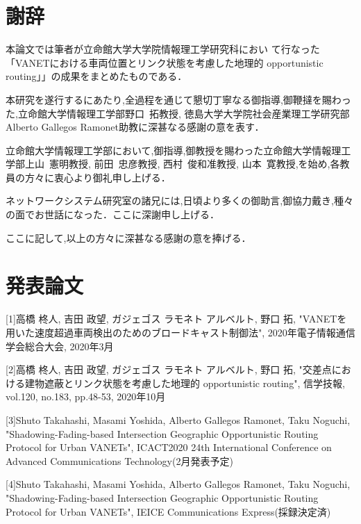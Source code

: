 \documentclass[10pt]{jreport}
\begin{document}
\chapter*{謝辞}
\sloppy 

本論文では筆者が立命館大学大学院情報理工学研究科におい
て行なった「VANETにおける車両位置とリンク状態を考慮した地理的
opportunistic routing」」の成果をまとめたものである．

本研究を遂行するにあたり,全過程を通じて懇切丁寧なる御指導,御鞭撻を賜わっ
た,立命館大学情報理工学部野口~拓教授, 徳島大学大学院社会産業理工学研究部Alberto Gallegos Ramonet助教に深甚なる感謝の意を表す．

立命館大学情報理工学部において,御指導,御教授を賜わった立命館大学情報理工学部上山~憲明教授, 前田~忠彦教授, 西村~俊和准教授, 山本~寛教授,を始め,各教員の方々に衷心より御礼申し上げる．

ネットワークシステム研究室の諸兄には,日頃より多くの御助言,御協力戴き,種々の面でお世話になった．ここに深謝申し上げる．

ここに記して,以上の方々に深甚なる感謝の意を捧げる．






\chapter*{発表論文}

[1]高橋 柊人, 吉田 政望, ガジェゴス ラモネト アルベルト, 野口 拓, "VANETを用いた速度超過車両検出のためのブロードキャスト制御法", 2020年電子情報通信学会総合大会, 2020年3月

[2]高橋 柊人, 吉田 政望, ガジェゴス ラモネト アルベルト, 野口 拓, "交差点における建物遮蔽とリンク状態を考慮した地理的 opportunistic routing", 信学技報, vol.120, no.183, pp.48-53, 2020年10月

[3]Shuto Takahashi, Masami Yoshida, Alberto Gallegos Ramonet, Taku Noguchi, "Shadowing-Fading-based Intersection Geographic Opportunistic Routing Protocol for Urban VANETs", ICACT2020 24th International Conference on Advanced Communications Technology(2月発表予定)

[4]Shuto Takahashi, Masami Yoshida, Alberto Gallegos Ramonet, Taku Noguchi, "Shadowing-Fading-based Intersection Geographic Opportunistic Routing Protocol for Urban VANETs", IEICE Communications Express(採録決定済)
\end{document}
